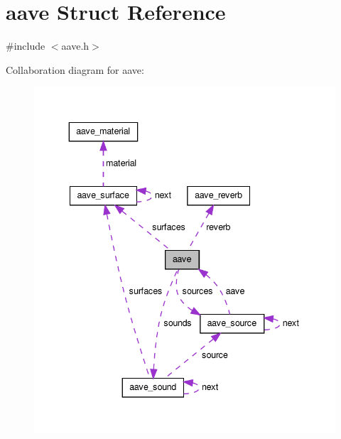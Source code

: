 \hypertarget{structaave}{\section{aave Struct Reference}
\label{structaave}
}


{\ttfamily \#include $<$aave.\-h$>$}



Collaboration diagram for aave\-:\nopagebreak
\begin{figure}[H]
\begin{center}
\leavevmode
\includegraphics[width=339pt]{structaave__coll__graph}
\end{center}
\end{figure}
